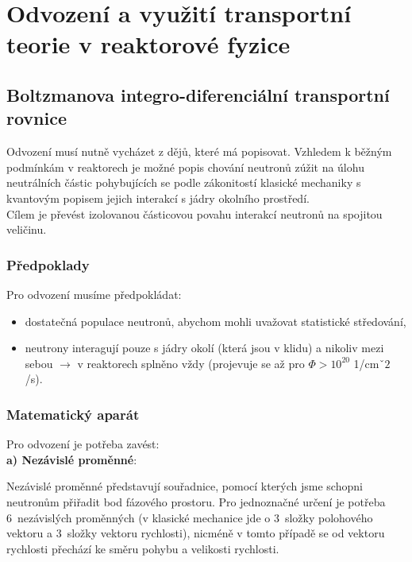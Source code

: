\section{Odvození a využití transportní teorie v reaktorové fyzice}

\subsection{Boltzmanova integro-diferenciální transportní rovnice}

Odvození musí nutně vycházet z dějů, které má popisovat. Vzhledem k běžným podmínkám v reaktorech je možné popis chování neutronů zúžit na úlohu neutrálních částic pohybujících se podle zákonitostí klasické mechaniky s kvantovým popisem jejich interakcí s jádry okolního prostředí.\\

Cílem je převést izolovanou částicovou povahu interakcí neutronů na spojitou veličinu.

\subsubsection{Předpoklady}

Pro odvození musíme předpokládat:

\begin{itemize}
  \item dostatečná populace neutronů, abychom mohli uvažovat statistické středování,
  \item neutrony interagují pouze s jádry okolí (která jsou v klidu) a nikoliv mezi sebou $\rightarrow$ v reaktorech splněno vždy (projevuje se až pro $\Phi > 10^{20}$ 1/cm$ˇ2$/s).
\end{itemize}

\subsubsection{Matematický aparát}

Pro odvození je potřeba zavést:\\

\textbf{a) Nezávislé proměnné}:

Nezávislé proměnné představují souřadnice, pomocí kterých jsme schopni neutronům přiřadit bod fázového prostoru. Pro jednoznačné určení je potřeba 6~nezávislých proměnných (v klasické mechanice jde o 3~složky polohového vektoru a 3~složky vektoru rychlosti), nicméně v tomto případě se od vektoru rychlosti přechází ke směru pohybu a velikosti rychlosti.\\

